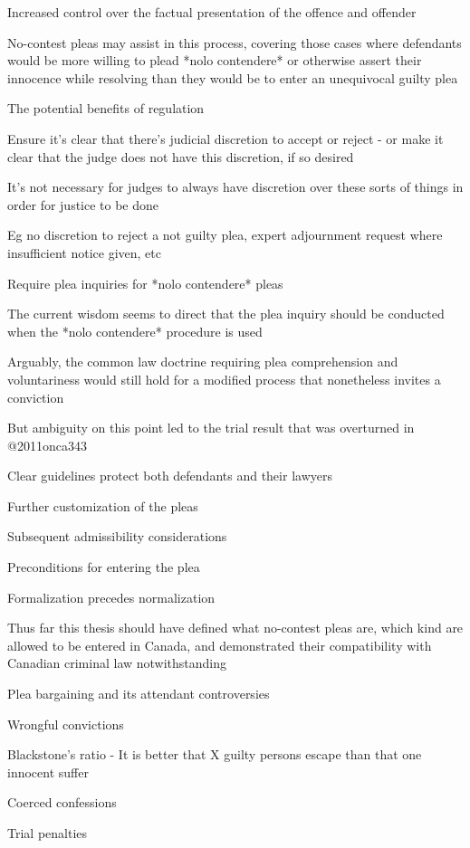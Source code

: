 Increased control over the factual presentation of the offence and offender

No-contest pleas may assist in this process, covering those cases where defendants would be more willing to plead *nolo contendere* or otherwise assert their innocence while resolving than they would be to enter an unequivocal guilty plea

The potential benefits of regulation

Ensure it's clear that there's judicial discretion to accept or reject - or make it clear that the judge does not have this discretion, if so desired

It's not necessary for judges to always have discretion over these sorts of things in order for justice to be done

Eg no discretion to reject a not guilty plea, expert adjournment request where insufficient notice given, etc

Require plea inquiries for *nolo contendere* pleas

The current wisdom seems to direct that the plea inquiry should be conducted when the *nolo contendere* procedure is used

Arguably, the common law doctrine requiring plea comprehension and voluntariness would still hold for a modified process that nonetheless invites a conviction

But ambiguity on this point led to the trial result that was overturned in @2011onca343

Clear guidelines protect both defendants and their lawyers

Further customization of the pleas

Subsequent admissibility considerations

Preconditions for entering the plea

Formalization precedes normalization

Thus far this thesis should have defined what no-contest pleas are, which kind are allowed to be entered in Canada, and demonstrated their compatibility with Canadian criminal law notwithstanding

Plea bargaining and its attendant controversies

Wrongful convictions

Blackstone's ratio - It is better that X guilty persons escape than that one innocent suffer

Coerced confessions

Trial penalties